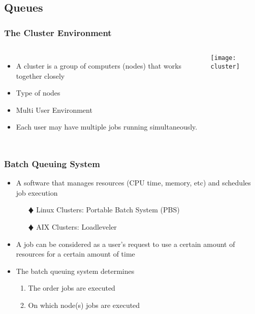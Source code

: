 \documentclass[slidestop,mathserif,compress,xcolor=svgnames,table]{beamer}
\newenvironment{bblock}[0]
{
\begin{beamerboxesrounded}[upper=uppercol1,lower=lowercol1,shadow=true]}
{\end{beamerboxesrounded}}
\begin{document}
\subsection{Queues}
\begin{frame}
  \frametitle{\small The Cluster Environment}
  \vspace{-0.5cm}
  \begin{columns}
    \column{4cm}
    \begin{itemize}
      \item A cluster is a group of computers (nodes) that works together closely
      \item Type of nodes
      \item Multi User Environment
      \item Each user may have multiple jobs running simultaneously.
    \end{itemize}
    \column{7cm}
    \begin{center}
      \texttt{[image: cluster]}
    \end{center}
  \end{columns}
\end{frame}

\begin{frame}
  \frametitle{\small Batch Queuing System}
  \begin{bblock}{}
    \begin{itemize}
      \item A software that manages resources (CPU time, memory, etc) and schedules job execution
      \begin{enumerate}
	\item[$\vardiamond$] Linux Clusters: Portable Batch System (PBS)
	\item[$\vardiamond$] AIX Clusters: Loadleveler
      \end{enumerate}
      \item A job can be considered as a user's request to use a certain amount of resources for a certain amount of time
      \item The batch queuing system determines
      \begin{enumerate}
	\item The order jobs are executed
	\item On which node(s) jobs are executed
      \end{enumerate}
    \end{itemize}
  \end{bblock}
\end{frame}
\end{document}
